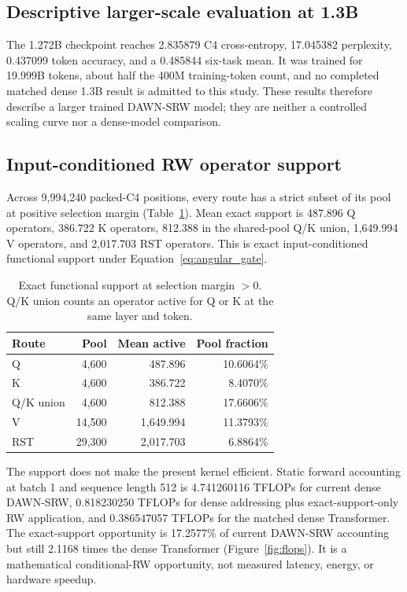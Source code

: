 \documentclass{article}
\newcommand{\DAWN}{DAWN-SRW}
\begin{document}
\subsection{Descriptive larger-scale evaluation at 1.3B}

The 1.272B checkpoint reaches 2.835879 C4 cross-entropy, 17.045382
perplexity, 0.437099 token accuracy, and a 0.485844 six-task mean. It was
trained for 19.999B tokens, about half the 400M training-token count, and no
completed matched dense 1.3B result is admitted to this study. These results
therefore describe a larger trained \DAWN{} model; they are neither a
controlled scaling curve nor a dense-model comparison.

\subsection{Input-conditioned RW operator support}
\label{sec:support}

Across 9,994,240 packed-C4 positions, every route has a strict subset of its
pool at positive selection margin (Table~\ref{tab:support}). Mean exact support
is 487.896 Q operators, 386.722 K operators, 812.388 in the shared-pool Q/K
union, 1,649.994 V operators, and 2,017.703 RST operators. This is exact
input-conditioned functional support under Equation~\ref{eq:angular_gate}.

\begin{table}[t]
\centering
\caption{Exact functional support at selection margin \(>0\). Q/K union counts
an operator active for Q or K at the same layer and token.}
\label{tab:support}
\small
\begin{tabular}{lrrr}
\toprule
Route & Pool & Mean active & Pool fraction\\
\midrule
Q & 4,600 & 487.896 & 10.6064\%\\
K & 4,600 & 386.722 & 8.4070\%\\
Q/K union & 4,600 & 812.388 & 17.6606\%\\
V & 14,500 & 1,649.994 & 11.3793\%\\
RST & 29,300 & 2,017.703 & 6.8864\%\\
\bottomrule
\end{tabular}
\end{table}

The support does not make the present kernel efficient. Static forward
accounting at batch 1 and sequence length 512 is 4.741260116 TFLOPs for
current dense \DAWN{}, 0.818230250 TFLOPs for dense addressing plus
exact-support-only RW application, and 0.386547057 TFLOPs for the matched
dense Transformer. The exact-support opportunity is 17.2577\% of current
\DAWN{} accounting but still 2.1168 times the dense Transformer
(Figure~\ref{fig:flops}). It is a mathematical conditional-RW opportunity,
not measured latency, energy, or hardware speedup.
\end{document}
